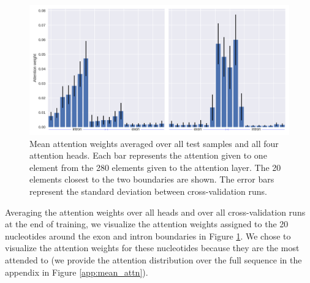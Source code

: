 \begin{figure}
	\centering\includegraphics[width=1\textwidth]{../visualizations/ch5-results/mean_attention_barchart_zoomed.png}
	\caption{Mean attention weights averaged over all test samples and all four attention heads. Each bar represents the attention given to one element from the 280 elements given to the attention layer. The 20 elements closest to the two boundaries are shown. The error bars represent the standard deviation between cross-validation runs. }
	\label{fig:mean_attn}
\end{figure}

Averaging the attention weights over all heads and over all cross-validation runs at the end of training, we visualize the attention weights assigned to the 20 nucleotides around the exon and intron boundaries in Figure \ref{fig:mean_attn}. We chose to visualize the attention weights for these nucleotides because they are the most attended to (we provide the attention distribution over the full sequence in the appendix in Figure \ref{app:mean_attn}). 






